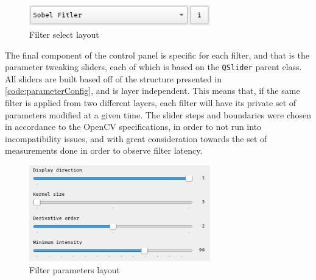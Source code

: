 \begin{figure}[H]
	\includegraphics[width=0.7\textwidth, height=0.09\textwidth]{resources/Buttons_Selector.png}
	\caption{Filter select layout}
\end{figure}

The final component of the control panel is specific for each filter, and that is the parameter tweaking
sliders, each of which is based on the \verb|QSlider| parent class. All sliders are built based off of the
structure presented in \cref{code:parameterConfig}, and is layer independent. This means that, if the same
filter is applied from two different layers, each filter will have its private set of parameters modified
at a given time. The slider steps and boundaries were chosen in accordance to the OpenCV specifications,
in order to not run into incompatibility issues, and with great consideration towards the set of measurements
done in order to observe filter latency.

\begin{figure}[H]
	\includegraphics[width=0.7\textwidth, height=0.5\textwidth]{resources/Buttons_Sliders.png}
	\caption{Filter parameters layout}
\end{figure}

